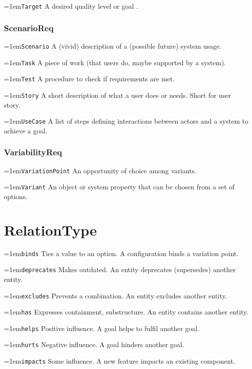 \documentclass[9pt,a4paper,oneside]{report}
\begin{document}
\begin{multicols*}{4}
\hangindent=1em\lstinline+Target+ A desired quality level or goal .

\subsubsection*{ScenarioReq}

\hangindent=1em\lstinline+Scenario+ A (vivid) description of a (possible future) system usage.

\hangindent=1em\lstinline+Task+ A piece of work (that users do, maybe supported by a system).

\hangindent=1em\lstinline+Test+ A procedure to check if requirements are met.

\hangindent=1em\lstinline+Story+ A short description of what a user does or needs. Short for user story.

\hangindent=1em\lstinline+UseCase+ A list of steps defining interactions between actors and a system to achieve a goal.

\subsubsection*{VariabilityReq}

\hangindent=1em\lstinline+VariationPoint+ An opportunity of choice among variants.

\hangindent=1em\lstinline+Variant+ An object or system property that can be chosen from a set of options.

\section*{RelationType}

\hangindent=1em\lstinline+binds+ Ties a value to an option. A configuration binds a variation point.

\hangindent=1em\lstinline+deprecates+ Makes outdated. An entity deprecates (supersedes) another entity.

\hangindent=1em\lstinline+excludes+ Prevents a combination. An entity excludes another entity.

\hangindent=1em\lstinline+has+ Expresses containment, substructure. An entity contains another entity.

\hangindent=1em\lstinline+helps+ Positive influence. A goal helps to fulfil another goal.

\hangindent=1em\lstinline+hurts+ Negative influence. A goal hinders another goal.

\hangindent=1em\lstinline+impacts+ Some influence. A new feature impacts an existing component.


\end{multicols*}
\end{document}
